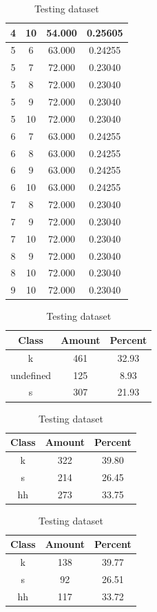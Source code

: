 \begin{table}
\begin{subtable}[h]{0.45\textwidth}
{\begin{tabular}{|c|c|c|c|}
 4 & 10 & 54.000 & 0.25605\\ \hline 
 5 & 6 & 63.000 & 0.24255\\ \hline 
 5 & 7 & 72.000 & 0.23040\\ \hline 
 5 & 8 & 72.000 & 0.23040\\ \hline 
 5 & 9 & 72.000 & 0.23040\\ \hline 
 5 & 10 & 72.000 & 0.23040\\ \hline 
 6 & 7 & 63.000 & 0.24255\\ \hline 
 6 & 8 & 63.000 & 0.24255\\ \hline 
 6 & 9 & 63.000 & 0.24255\\ \hline 
 6 & 10 & 63.000 & 0.24255\\ \hline 
 7 & 8 & 72.000 & 0.23040\\ \hline 
 7 & 9 & 72.000 & 0.23040\\ \hline 
 7 & 10 & 72.000 & 0.23040\\ \hline 
 8 & 9 & 72.000 & 0.23040\\ \hline 
 8 & 10 & 72.000 & 0.23040\\ \hline 
 9 & 10 & 72.000 & 0.23040\\ \hline 

\end{tabular}
}\label{xlscentroid2010}
\caption{xcscentroid2010}
\end{subtable}

\begin{subtable}[h]{0.45\textwidth}
\centering
\begin{tabular}{|c|c|c|}
\hline
Class & Amount & Percent\\ \hline
k & 461 & 32.93\\ \hline
undefined & 125 & 8.93\\ \hline
s & 307 & 21.93\\ \hline
\end{tabular}
\caption{Entire dataset after stripping short sounds}
\end{subtable}
\hfill
\begin{subtable}[h]{0.45\textwidth}
\centering
\begin{tabular}{|c|c|c|}
\hline
Class & Amount & Percent\\ \hline
k & 322 & 39.80\\ \hline
s & 214 & 26.45\\ \hline
hh & 273 & 33.75\\ \hline
\end{tabular}
\caption{Training dataset}
\end{subtable}
\hfill
\begin{subtable}[h]{0.45\textwidth}
\centering
\begin{tabular}{|c|c|c|}
\hline
Class & Amount & Percent\\ \hline
k & 138 & 39.77\\ \hline
s & 92 & 26.51\\ \hline
hh & 117 & 33.72\\ \hline
\end{tabular}
\caption{Testing dataset}
\end{subtable}
\hfill


\end{table}
